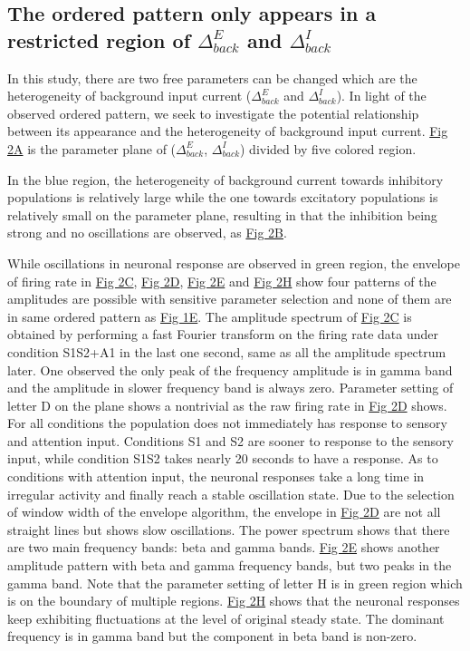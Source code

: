 \documentclass[10pt,letterpaper]{article}
\begin{document}
\subsection*{The ordered pattern only appears in a restricted region of $\Delta_{back}^{E}$ and $\Delta_{back}^{I}$}
In this study, there are two free parameters can be changed which are the heterogeneity of background input current ($\Delta_{back}^{E}$ and $\Delta_{back}^{I}$). In light of the observed ordered pattern, we seek to investigate the potential relationship between its appearance and the heterogeneity of background input current. \hyperlink{fig:fig2}{Fig 2A} is the parameter plane of ($\Delta_{back}^{E}$, $\Delta_{back}^{I}$) divided by five colored region. 

In the blue region, the heterogeneity of background current towards inhibitory populations is relatively large while the one towards excitatory populations is relatively small on the parameter plane, resulting in that the inhibition being strong and no oscillations are observed, as \hyperlink{fig:fig2}{Fig 2B}. 

While oscillations in neuronal response are observed in green region, the envelope of firing rate in \hyperlink{fig:fig2}{Fig 2C}, \hyperlink{fig:fig2}{Fig 2D}, \hyperlink{fig:fig2}{Fig 2E} and \hyperlink{fig:fig2}{Fig 2H} show four patterns of the amplitudes are possible with sensitive parameter selection and none of them are in same ordered pattern as \hyperlink{fig:fig1}{Fig 1E}.
The amplitude spectrum of \hyperlink{fig:fig1}{Fig 2C} is obtained by performing a fast Fourier transform on the firing rate data under condition S1S2+A1 in the last one second, same as all the amplitude spectrum later. One observed the only peak of the frequency amplitude is in gamma band and the amplitude in slower frequency band is always zero. Parameter setting of letter D on the plane shows a nontrivial as the raw firing rate in \hyperlink{fig:fig2}{Fig 2D} shows. For all conditions the population does not immediately has response to sensory and attention input. Conditions S1 and S2 are sooner to response to the sensory input, while condition S1S2 takes nearly 20 seconds to have a response. As to conditions with attention input, the neuronal responses take a long time in irregular activity and finally reach a stable oscillation state. Due to the selection of window width of the envelope algorithm, the envelope in \hyperlink{fig:fig2}{Fig 2D} are not all straight lines but shows slow oscillations. The power spectrum shows that there are two main frequency bands: beta and gamma bands. \hyperlink{fig: fig2}{Fig 2E} shows another amplitude pattern with beta and gamma frequency bands, but two peaks in the gamma band. Note that the parameter setting of letter H is in green region which is on the boundary of multiple regions. \hyperlink{fig:fig2}{Fig 2H} shows that the neuronal responses keep exhibiting fluctuations at the level of original steady state. The dominant frequency is in gamma band but the component in beta band is non-zero. 
\end{document}
